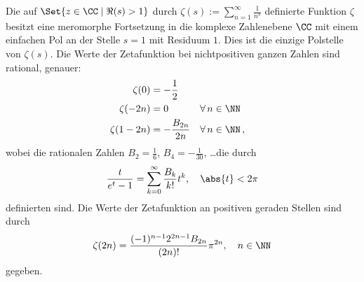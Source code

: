 \begin{satz}
Die auf $\Set {z \in \CC \mid \Re(s) > 1}$ durch $\zeta(s) := \sum_{n=1}^\infty \frac 1{n^s}$ definierte Funktion $\zeta$ besitzt eine meromorphe Fortsetzung in die komplexe Zahlenebene $\CC$ mit einem einfachen Pol an der Stelle $s = 1$ mit Residuum $1$. Dies ist die einzige Polstelle von $\zeta (s)$. Die Werte der Zetafunktion bei nichtpositiven ganzen Zahlen sind rational, genauer:
\begin{align*}
	\zeta(0) &= - \frac 12 \\
	\zeta(-2n) &= 0 && \forall \, n \in \NN \\
	\zeta(1-2n) &= - \frac {B_{2n}}{2n} && \forall \, n \in \NN
	\,,
\end{align*}
wobei die rationalen Zahlen $B_2 = \frac 16$, $B_4 = - \frac 1{30}$, \ldots die durch
\[
	\frac t{e^t - 1} = \sum_{k=0}^\infty \frac {B_k}{k!} t^k, \quad \abs{t} < 2\pi
\]
definierten  sind. Die Werte der Zetafunktion an positiven geraden Stellen sind durch
\[
	\zeta(2n) = \frac {(-1)^{n-1} 2^{2n-1} B_{2n}}{(2n)!} \pi^{2n}, \quad n \in \NN
\]
gegeben.
\end{satz}


